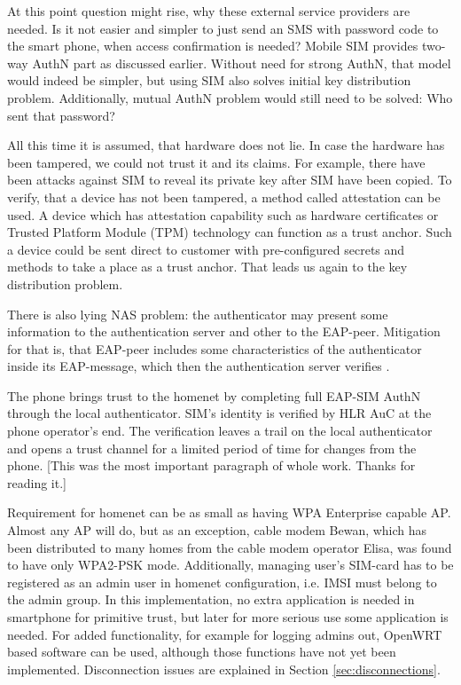 \documentclass[12pt,a4paper,english]{tutthesis}
\begin{document}
At this point question might rise, why these external service
providers are needed. Is it not easier and simpler to just send 
an SMS with password code to the smart phone, when access confirmation is needed?
Mobile SIM provides two-way AuthN part as discussed earlier.
Without need for strong AuthN, that model would indeed be 
simpler, but using SIM also solves initial key distribution problem.
Additionally, mutual AuthN problem would still need to be solved:
Who sent that password?



All this time it is assumed, that hardware does not lie. In case
the hardware has been tampered, we could not trust it and its claims.
For example, there have been attacks against SIM to reveal its private
key after SIM have been copied.  To verify, that a device has not been
tampered, a method called attestation can be used.
A device which has attestation capability such as 
hardware certificates or Trusted Platform Module (TPM) technology
can function as a trust anchor.
Such a device could be sent direct to customer with pre-configured
secrets and methods to take a place as a trust anchor. 
That leads us again to the key distribution problem.

There is also lying NAS problem: the authenticator may present some 
information to the authentication server and other to the EAP-peer.
Mitigation for that is, that EAP-peer includes some 
characteristics of the authenticator inside its EAP-message, which
then the authentication server verifies \cite[rfc6677]{rfc6677}.



The phone brings trust to the homenet by completing full EAP-SIM AuthN through
the local authenticator. SIM's identity is verified by HLR AuC at the phone
operator's end. The verification leaves a trail on the local authenticator and
opens a trust channel for a limited period of time for changes from the phone.
[This was the most important paragraph of whole work. Thanks for
reading it.]





Requirement for homenet can be as small as having WPA Enterprise capable
AP. Almost any AP will do, but as an exception, cable modem Bewan, which 
has been distributed to many homes from the cable modem operator Elisa, was found to have only WPA2-PSK mode.
Additionally, managing user's SIM-card has to be registered as an admin user in homenet 
configuration, i.e. IMSI must belong to the admin group.
In this implementation, no extra application is needed in smartphone
for primitive trust, but later for more serious use some application is needed.
For added functionality, for example for logging admins out, OpenWRT
based software can be used, although those functions have not yet been
implemented. Disconnection issues are explained in Section
\ref{sec:disconnections}.
\end{document}
